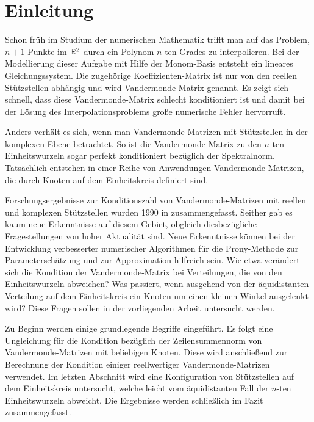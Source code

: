 \chapter{Einleitung}


Schon früh im Studium der numerischen Mathematik trifft man auf das Problem,
$n+1$ Punkte im $\mathbb{R}^2$ durch ein Polynom $n$-ten Grades zu interpolieren.  Bei
der Modellierung dieser Aufgabe mit Hilfe der Monom-Basis entsteht ein lineares
Gleichungssystem.  Die zugehörige Koeffizienten-Matrix ist nur von den reellen
Stützstellen abhängig und wird Vandermonde-Matrix genannt.  Es zeigt sich
schnell, dass diese Vandermonde-Matrix schlecht konditioniert ist und damit bei
der Lösung des Interpolationsproblems große numerische Fehler hervorruft.

Anders verhält es sich, wenn man Vandermonde-Matrizen mit Stützstellen in der
komplexen Ebene betrachtet.  So ist die Vandermonde-Matrix zu den $n$-ten
Einheitswurzeln sogar perfekt konditioniert bezüglich der Spektralnorm.
Tatsächlich entstehen in einer Reihe von Anwendungen Vandermonde-Matrizen, die
durch Knoten auf dem Einheitskreis definiert sind.

Forschungsergebnisse zur Konditionszahl von Vandermonde-Matrizen mit reellen
und komplexen Stützstellen wurden 1990 in \cite{gautschi1} zusammengefasst.
Seither gab es kaum neue Erkenntnisse auf diesem Gebiet, obgleich
diesbezügliche Fragestellungen von hoher Aktualität sind.
Neue Erkenntnisse können bei der Entwicklung verbesserter numerischer
Algorithmen für die Prony-Methode zur Parameterschätzung und zur Approximation
hilfreich sein.
Wie etwa verändert sich die Kondition der Vandermonde-Matrix bei Verteilungen,
die von den Einheitswurzeln abweichen?  Was passiert, wenn ausgehend von der
äquidistanten Verteilung auf dem Einheitskreis ein Knoten um einen kleinen
Winkel ausgelenkt wird?
Diese Fragen sollen in der vorliegenden Arbeit untersucht werden.

Zu Beginn werden einige grundlegende Begriffe eingeführt. Es folgt eine
Ungleichung für die Kondition bezüglich der Zeilensummennorm von
Vandermonde-Matrizen mit beliebigen Knoten.  Diese wird anschließend zur
Berechnung der Kondition einiger reellwertiger Vandermonde-Matrizen verwendet.
Im letzten Abschnitt wird eine Konfiguration von Stützstellen auf dem
Einheitskreis untersucht, welche leicht vom äquidistanten Fall der $n$-ten
Einheitswurzeln abweicht. Die Ergebnisse werden schließlich im Fazit
zusammengefasst.
